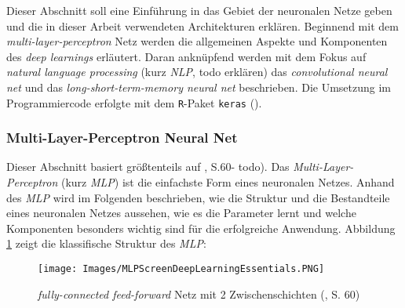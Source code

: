 \documentclass[a4paper,11pt]{article}
\begin{document}
Dieser Abschnitt soll eine Einführung in das Gebiet der neuronalen Netze geben und die in dieser Arbeit verwendeten Architekturen erklären. Beginnend mit dem \textit{multi-layer-perceptron} Netz werden die allgemeinen Aspekte und Komponenten des \textit{deep learnings} erläutert. Daran anknüpfend werden mit dem Fokus auf \textit{natural language processing} (kurz \textit{NLP}, todo erklären) das \textit{convolutional neural net} und das \textit{long-short-term-memory neural net} beschrieben. Die Umsetzung im Programmiercode erfolgte mit dem \texttt{R}-Paket \texttt{keras} (\cite{kerasR}).


\subsubsection{Multi-Layer-Perceptron Neural Net}

Dieser Abschnitt basiert größtenteils auf \cite{deepEssentials}, S.60- todo).
Das \textit{Multi-Layer-Perceptron} (kurz \textit{MLP}) ist die einfachste Form eines neuronalen Netzes. Anhand des \textit{MLP} wird im Folgenden beschrieben, wie die Struktur und die Bestandteile eines neuronalen Netzes aussehen, wie es die Parameter lernt und welche Komponenten besonders wichtig sind für die erfolgreiche Anwendung. Abbildung \ref{abb:MLPScreen} zeigt die klassifische Struktur des \textit{MLP}:


\begin{figure}[!ht]
\begin{center}
\texttt{[image: Images/MLPScreenDeepLearningEssentials.PNG]}
\label{abb:MLPScreen}
\caption{\textit{fully-connected feed-forward} Netz mit 2 Zwischenschichten  (\cite{deepEssentials}, S. 60) }
\end{center}
\end{figure}
\end{document}
